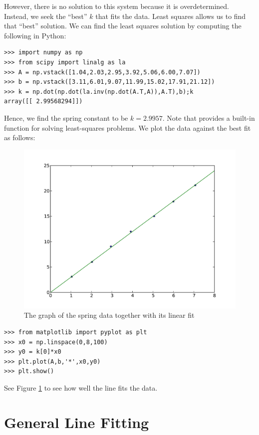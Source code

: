 However, there is no solution to this system because it is overdetermined.  Instead, we seek the ``best'' $k$ that fits the data.  Least squares allows us to find that ``best'' solution. We can find the least squares solution by computing the following in Python:
\begin{lstlisting}
>>> import numpy as np
>>> from scipy import linalg as la
>>> A = np.vstack([1.04,2.03,2.95,3.92,5.06,6.00,7.07])
>>> b = np.vstack([3.11,6.01,9.07,11.99,15.02,17.91,21.12])
>>> k = np.dot(np.dot(la.inv(np.dot(A.T,A)),A.T),b);k
array([[ 2.99568294]])
\end{lstlisting}
Hence, we find the spring constant to be $k = 2.9957$.
Note that  provides a built-in function for solving least-squares problems.
We plot the data against the best fit as follows:
\begin{figure}[h!]
\label{fig1}
\begin{center}
\includegraphics[width=\textwidth]{line_lstsq}
\caption{The graph of the spring data together with its linear fit}
\label{Fig:SpringFit}
\end{center}
\end{figure}

\begin{lstlisting}
>>> from matplotlib import pyplot as plt
>>> x0 = np.linspace(0,8,100)
>>> y0 = k[0]*x0
>>> plt.plot(A,b,'*',x0,y0)
>>> plt.show()
\end{lstlisting}
See Figure \ref{Fig:SpringFit} to see how well the line fits the data.


\section*{General Line Fitting}

